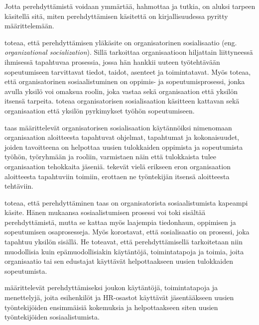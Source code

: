 \documentclass[utf8]{gradu3}
\begin{document}
Jotta perehdyttämistä voidaan ymmärtää, hahmottaa ja tutkia, on aluksi tarpeen käsitellä sitä, miten perehdyttämisen käsitettä on kirjallisuudessa pyritty määrittelemään.

\textcite{wanberg-2012} toteaa, että perehdyttämisen yläkäsite on organisatorinen sosialisaatio (eng. \textit{organizational socialization}). Sillä \textcite{wanberg-2012} tarkoittaa organisaatioon hiljattain liittyneessä ihmisessä tapahtuvaa prosessia, jossa hän hankkii uuteen työtehtävään sopeutumiseen tarvittavat tiedot, taidot, asenteet ja toimintatavat. Myös \textcite{chao-2012} toteaa, että organisatorinen sosiaalistuminen on oppimis- ja sopeutumisprosessi, jonka avulla yksilö voi omaksua roolin, joka vastaa sekä organisaation että yksilön itsensä tarpeita. \textcite{chao-2012} toteaa organisatorisen sosialisaation käsitteen kattavan sekä organisaation että yksilön pyrkimykset työhön sopeutumiseen.

\textcite{saks-gruman-2012} taas määrittelevät organisatorisen sosialisaation käytännöiksi nimenomaan organisaation aloitteesta tapahtuvat ohjelmat, tapahtumat ja kokonaisuudet, joiden tavoitteena on helpottaa uusien tulokkaiden oppimista ja sopeutumista työhön, työryhmään ja rooliin, varmistaen näin että tulokkaista tulee organisaation tehokkaita jäseniä. \textcite{saks-gruman-2012} tekevät vielä erikseen eron organisaation aloitteesta tapahtuviin toimiin, erottaen ne työntekijän itsensä aloitteesta tehtäviin.

\textcite{wanberg-2012} toteaa, että perehdyttäminen taas on organisatorista sosiaalistumista kapeampi käsite. Hänen mukaansa sosiaalistumisen prosessi voi toki sisältää perehdyttämistä, mutta se kattaa myös laajempia tiedonhaun, oppimisen ja sopeutumisen osaprosesseja. Myös \textcite{klein-polin-2012} korostavat, että sosialisaatio on prosessi, joka tapahtuu yksilön sisällä. He toteavat, että perehdyttämisellä tarkoitetaan niin muodollisia kuin epämuodollisiakin käytäntöjä, toimintatapoja ja toimia, joita organisaatio tai sen edustajat käyttävät helpottaakseen uusien tulokkaiden sopeutumista.


\textcite{klein-polin-2012} määrittelevät perehdyttämiseksi joukon käytäntöjä, toimintatapoja ja menettelyjä, joita esihenkilöt ja HR-osastot käyttävät jäsentääkseen uusien työntekijöiden ensimmäisiä kokemuksia ja helpottaakseen siten uusien työntekijöiden sosiaalistumista.
\end{document}
